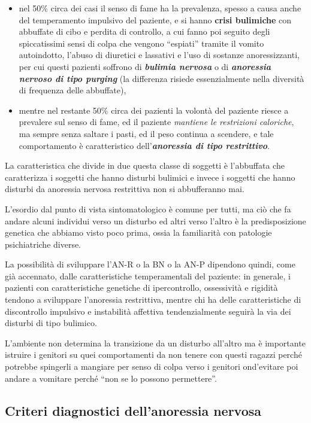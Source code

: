 \begin{itemize}
\item
  nel 50\% circa dei casi il senso di fame ha la prevalenza, spesso a
  causa anche del temperamento impulsivo del paziente, e si hanno
  \textbf{crisi bulimiche} con abbuffate di cibo e perdita di controllo,
  a cui fanno poi seguito degli spiccatissimi sensi di colpa che vengono
  ``espiati'' tramite il vomito autoindotto, l'abuso di diuretici e
  lassativi e l'uso di sostanze anoressizzanti, per cui questi pazienti
  soffrono di \textbf{\emph{bulimia nervosa}} o di
  \textbf{\emph{anoressia nervoso di tipo purging}} (la differenza
  risiede essenzialmente nella diversità di frequenza delle abbuffate),
\item
  mentre nel restante 50\% circa dei pazienti la volontà del paziente
  riesce a prevalere sul senso di fame, ed il paziente \emph{mantiene le
  restrizioni caloriche}, ma sempre senza saltare i pasti, ed il peso
  continua a scendere, e tale comportamento è caratteristico
  dell'\textbf{\emph{anoressia di tipo restrittivo}}.
\end{itemize}

La caratteristica che divide in due questa classe di soggetti è
l'abbuffata che caratterizza i soggetti che hanno disturbi bulimici e
invece i soggetti che hanno disturbi da anoressia nervosa restrittiva
non si abbufferanno mai.

L'esordio dal punto di vista sintomatologico è comune per tutti, ma ciò
che fa andare alcuni individui verso un disturbo ed altri verso l'altro
è la predisposizione genetica che abbiamo visto poco prima, ossia la
familiarità con patologie psichiatriche diverse.

La possibilità di sviluppare l'AN-R o la BN o la AN-P dipendono quindi,
come già accennato, dalle caratteristiche temperamentali del paziente:
in generale, i pazienti con caratteristiche genetiche di ipercontrollo,
ossessività e rigidità tendono a sviluppare l'anoressia restrittiva,
mentre chi ha delle caratteristiche di discontrollo impulsivo e
instabilità affettiva tendenzialmente seguirà la via dei disturbi di
tipo bulimico.

L'ambiente non determina la transizione da un disturbo all'altro ma è
importante istruire i genitori su quei comportamenti da non tenere con
questi ragazzi perché potrebbe spingerli a mangiare per senso di colpa
verso i genitori ond'evitare poi andare a vomitare perché ``non se lo
possono permettere''.

\subsection{Criteri diagnostici dell'anoressia nervosa}

